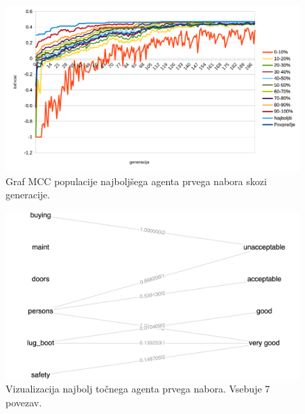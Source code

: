 \begin{figure}[H]
    \begin{center}
        \includegraphics[width=13cm]{car/1/mcc}
    \end{center}
    \caption{Graf MCC populacije najboljšega agenta prvega nabora skozi generacije.}
    \label{fig:car_mcc_1}
\end{figure}

\begin{figure}[H]
    \begin{center}
        \includegraphics[width=13cm]{car/1/acc_g}
    \end{center}
    \caption{Vizualizacija najbolj točnega agenta prvega nabora. Vsebuje 7 povezav.}
    \label{fig:car_acc_1_g}
\end{figure}

